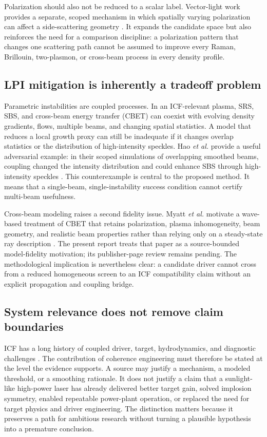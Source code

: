 \documentclass[conference]{../../../../Conference-LaTeX-template_10-17-19/IEEEtran}
\begin{document}
Polarization should also not be reduced to a scalar label. Vector-light work provides a separate, scoped mechanism in which spatially varying polarization can affect a side-scattering geometry \cite{jia2023}. It expands the candidate space but also reinforces the need for a comparison discipline: a polarization pattern that changes one scattering path cannot be assumed to improve every Raman, Brillouin, two-plasmon, or cross-beam process in every density profile.

\subsection{LPI mitigation is inherently a tradeoff problem}
Parametric instabilities are coupled processes. In an ICF-relevant plasma, SRS, SBS, and cross-beam energy transfer (CBET) can coexist with evolving density gradients, flows, multiple beams, and changing spatial statistics. A model that reduces a local growth proxy can still be inadequate if it changes overlap statistics or the distribution of high-intensity speckles. Hao \emph{et al.} provide a useful adversarial example: in their scoped simulations of overlapping smoothed beams, coupling changed the intensity distribution and could enhance SBS through high-intensity speckles \cite{hao2023}. This counterexample is central to the proposed method. It means that a single-beam, single-instability success condition cannot certify multi-beam usefulness.

Cross-beam modeling raises a second fidelity issue. Myatt \emph{et al.} motivate a wave-based treatment of CBET that retains polarization, plasma inhomogeneity, beam geometry, and realistic beam properties rather than relying only on a steady-state ray description \cite{myatt2017}. The present report treats that paper as a source-bounded model-fidelity motivation; its publisher-page review remains pending. The methodological implication is nevertheless clear: a candidate driver cannot cross from a reduced homogeneous screen to an ICF compatibility claim without an explicit propagation and coupling bridge.

\subsection{System relevance does not remove claim boundaries}
ICF has a long history of coupled driver, target, hydrodynamics, and diagnostic challenges \cite{betti2016,atzeni2004}. The contribution of coherence engineering must therefore be stated at the level the evidence supports. A source may justify a mechanism, a modeled threshold, or a smoothing rationale. It does not justify a claim that a sunlight-like high-power laser has already delivered better target gain, solved implosion symmetry, enabled repeatable power-plant operation, or replaced the need for target physics and driver engineering. The distinction matters because it preserves a path for ambitious research without turning a plausible hypothesis into a premature conclusion.
\end{document}
